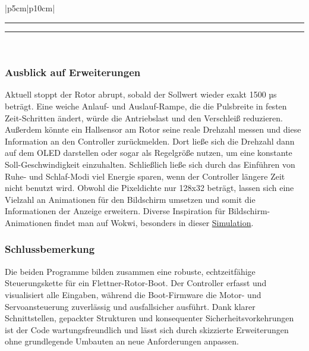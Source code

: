 \documentclass[a4paper,12pt]{article}
\begin{document}
\begin{table}[H]
\begin{tabular}{|p{5cm}|p{10cm}|}
\end{tabular}
\caption{Verwendete Konstanten im Boot}
\label{tab:boatconstants1}
\end{table}


\noindent\rule{\linewidth}{0.4pt}  %

\noindent\rule{\linewidth}{0.4pt}\\[0.5em]  %


\subsubsection{Ausblick auf Erweiterungen}
Aktuell stoppt der Rotor abrupt, sobald der Sollwert wieder exakt 1500 µs beträgt. Eine weiche Anlauf- und Auslauf-Rampe, die die Pulsbreite in festen Zeit-Schritten ändert, würde die Antriebslast und den Verschleiß reduzieren. Außerdem könnte ein Hallsensor am Rotor seine reale Drehzahl messen und diese Information an den Controller zurückmelden. Dort ließe sich die Drehzahl dann auf dem OLED darstellen oder sogar als Regelgröße nutzen, um eine konstante Soll-Geschwindigkeit einzuhalten. Schließlich ließe sich durch das Einführen von Ruhe- und Schlaf-Modi viel Energie sparen, wenn der Controller längere Zeit nicht benutzt wird. Obwohl die Pixeldichte nur 128x32 beträgt, lassen sich eine Vielzahl an Animationen für den Bildschirm umsetzen und somit die Informationen der Anzeige erweitern.
Diverse Inspiration für Bildschirm-Animationen findet man auf Wokwi\cite{wokwi_website}, besonders in dieser \href{https://wokwi.com/projects/344892392214626898}{Simulation}.

\subsubsection{Schlussbemerkung}
Die beiden Programme bilden zusammen eine robuste, echtzeitfähige Steuerungskette für ein Flettner-Rotor-Boot. Der Controller erfasst und visualisiert alle Eingaben, während die Boot-Firmware die Motor- und Servoansteuerung zuverlässig und ausfallsicher ausführt. Dank klarer Schnittstellen, gepackter Strukturen und konsequenter Sicherheitsvorkehrungen ist der Code wartungsfreundlich und lässt sich durch skizzierte Erweiterungen ohne grundlegende Umbauten an neue Anforderungen anpassen.

\newpage
\end{document}
